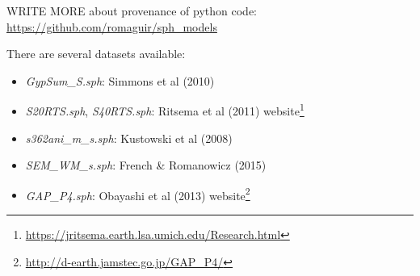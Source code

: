 
WRITE MORE about provenance of python code: \url{https://github.com/romaguir/sph_models}

There are several datasets available:
\begin{itemize}
\item {\sl GypSum\_S.sph}: Simmons et al (2010) \cite{sifb10}
\item {\sl S20RTS.sph}, {\sl S40RTS.sph}:  Ritsema et al (2011) \cite{ridv11} 
      website\footnote{\url{https://jritsema.earth.lsa.umich.edu/Research.html}}
\item {\sl s362ani\_m\_s.sph}: Kustowski et al (2008) \cite{kued08}
\item {\sl SEM\_WM\_s.sph}: French \& Romanowicz (2015) \cite{frro15}
\item {\sl GAP\_P4.sph}: Obayashi et al (2013) \cite{obyn13,fuob13} 
      website\footnote{\url{http://d-earth.jamstec.go.jp/GAP_P4/}}
\end{itemize}

